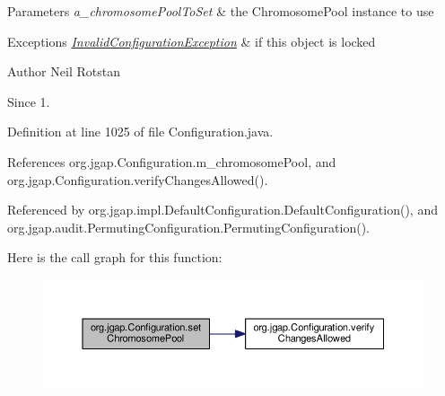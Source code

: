 \begin{DoxyParams}{Parameters}
{\em a\-\_\-chromosome\-Pool\-To\-Set} & the Chromosome\-Pool instance to use \\
\hline
\end{DoxyParams}

\begin{DoxyExceptions}{Exceptions}
{\em \hyperlink{classorg_1_1jgap_1_1_invalid_configuration_exception}{Invalid\-Configuration\-Exception}} & if this object is locked\\
\hline
\end{DoxyExceptions}
\begin{DoxyAuthor}{Author}
Neil Rotstan 
\end{DoxyAuthor}
\begin{DoxySince}{Since}
1. 
\end{DoxySince}


Definition at line 1025 of file Configuration.\-java.



References org.\-jgap.\-Configuration.\-m\-\_\-chromosome\-Pool, and org.\-jgap.\-Configuration.\-verify\-Changes\-Allowed().



Referenced by org.\-jgap.\-impl.\-Default\-Configuration.\-Default\-Configuration(), and org.\-jgap.\-audit.\-Permuting\-Configuration.\-Permuting\-Configuration().



Here is the call graph for this function\-:
\nopagebreak
\begin{figure}[H]
\begin{center}
\leavevmode
\includegraphics[width=350pt]{classorg_1_1jgap_1_1_configuration_a45e3805863470751268692549cb721b7_cgraph}
\end{center}
\end{figure}


